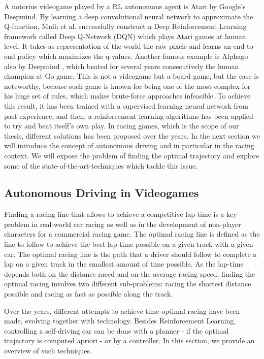 A notorius videogame played by a RL autonomous agent is Atari \cite{atari} by Google's Deepmind. By learning a deep convolutional neural network to approximate the Q-function, Mnih et al. successfully construct a Deep Reinforcement Learning framework called Deep Q-Network (DQN) which plays Atari games at human level. It takes as representation of the world the raw pixels and learns an end-to-end policy which maximizes the q-values.
Another famous example is Alphago also by Deepmind \cite{alphago}, which beated for several years consecutively the human champion at Go game. This is not a videogame but a board game, but the case is noteworthy, because such game is known for being one of the most complex  for his huge set of rules, which makes brute-force approaches infeasible. To achieve this result, it has been trained with a supervised learning neural network from past experience, and then, a reinforcement learning algorithms has been applied to try and beat itself's own play. 
In racing games, which is the scope of our thesis, different solutions has been proposed over the years. In the next section we will introduce the concept of autonomous driving and in particular in the racing context. We will expose the problem of finding the optimal trajectory and explore some of the state-of-the-art-techniques which tackle this issue.


\subsection{Autonomous Driving in Videogames}
Finding a racing line that allows to achieve a competitive lap-time is a key problem in real-world car racing as well as in the development of non-player characters for a commercial racing game.
The optimal racing line is defined as the line to follow to achieve the best lap-time possible on a given track with a given car. The optimal racing line is the path that a driver should follow to complete a lap on a given track in the smallest amount of time possible. As the lap-time depends both on the distance raced and on the average racing speed, finding the optimal racing involves two different sub-problems: racing the shortest distance possible and racing as fast as possible along the track.

Over the years, different attempts to achieve time-optimal racing have been made, evolving together with technology. Besides Reinforcement Learning, controlling a self-driving car can be done with a planner - if the optimal trajectory is computed apriori - or by a controller. In this section, we provide an overview of such techniques. 


